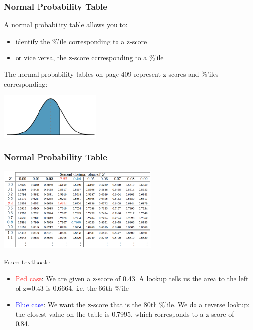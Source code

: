 \documentclass[slides]{beamer}
\newcommand{\blue}[1]{\textcolor{blue2}{#1}}
\begin{document}
\begin{frame}
\frametitle{Normal Probability Table}

A \blue{normal probability table} allows you to:
\begin{itemize}
\item identify the \%'ile corresponding to a z-score
\item or vice versa, the z-score corresponding to a \%'ile
\end{itemize}

\vspace{0.5cm}

\pause The normal probability tables on page 409 represent z-scores and \%'iles corresponding:
\begin{center}
\includegraphics[width=5cm]{figure/area_left.png}
\end{center}

\end{frame}



\begin{frame}
\frametitle{Normal Probability Table}
\begin{center}
\includegraphics[width=8cm]{figure/normal_table.png}
\end{center}
\pause From textbook:
\begin{itemize}
\item \textcolor{red}{Red case}: We are given a z-score of 0.43.  A lookup tells us the area to the left of z=0.43 is 0.6664, i.e. the 66th \%'ile
\pause\item \textcolor{blue}{Blue case}:  We want the z-score that is the 80th \%'ile.  We do a reverse lookup: the closest value on the table is 0.7995, which corresponds to a z-score of 0.84. 
\end{itemize}


\end{frame}
\end{document}
